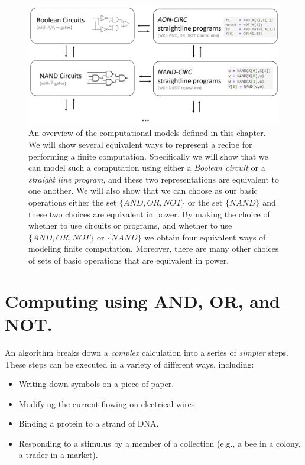 \begin{figure}
\centering
\includegraphics[width=\textwidth, height=0.25\paperheight, keepaspectratio]{../figure/compcharoverview.png}
\caption{An overview of the computational models defined in this
chapter. We will show several equivalent ways to represent a recipe for
performing a finite computation. Specifically we will show that we can
model such a computation using either a \emph{Boolean circuit} or a
\emph{straight line program}, and these two representations are
equivalent to one another. We will also show that we can choose as our
basic operations either the set
\(\{ \ensuremath{\mathit{AND}} , \ensuremath{\mathit{OR}} , \ensuremath{\mathit{NOT}} \}\)
or the set \(\{ \ensuremath{\mathit{NAND}} \}\) and these two choices
are equivalent in power. By making the choice of whether to use circuits
or programs, and whether to use
\(\{ \ensuremath{\mathit{AND}} , \ensuremath{\mathit{OR}} , \ensuremath{\mathit{NOT}} \}\)
or \(\{ \ensuremath{\mathit{NAND}} \}\) we obtain four equivalent ways
of modeling finite computation. Moreover, there are many other choices
of sets of basic operations that are equivalent in power.}
\label{compchapoverviewfig}
\end{figure}

\section{Computing using AND, OR, and
NOT.}\label{Computing-using-AND-OR-an}

An algorithm breaks down a \emph{complex} calculation into a series of
\emph{simpler} steps. These steps can be executed in a variety of
different ways, including:

\begin{itemize}
\item
  Writing down symbols on a piece of paper.
\item
  Modifying the current flowing on electrical wires.
\item
  Binding a protein to a strand of DNA.
\item
  Responding to a stimulus by a member of a collection (e.g., a bee in a
  colony, a trader in a market).
\end{itemize}

